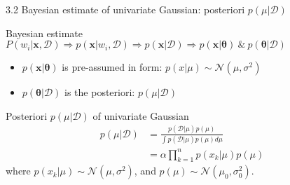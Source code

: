 \documentclass[compress,blue]{beamer}
\newcommand{\bx}{\mathbf{x}}
\newcommand{\calD}{\mathcal{D}}
\begin{document}
\begin{frame}{3.2 Bayesian estimate of univariate Gaussian: posteriori $p(\mu|\calD)$}
	\begin{block}{Bayesian estimate}
		$P(w_i | \bx, \calD) \Rightarrow p(\bx | w_i, \calD) \Rightarrow p(\bx | \calD) \Rightarrow p(\bx | \mathbf{\theta}) ~\&~ p(\mathbf{\theta} | \calD) $
		\begin{itemize}
			\item  $p(\bx | \mathbf{\theta})$ is pre-assumed in form: $p(x|\mu) \sim \mathcal{N}(\mu, \sigma^2)$
			\item $p(\mathbf{\theta} | \calD)$ is the posteriori: $p(\mu|\calD)$
		\end{itemize}
	\end{block}

	\begin{block}{Posteriori $p(\mu|\calD)$ of univariate Gaussian}
		\vspace{-0.15in}
		\begin{align}
			p(\mu|\calD) &= \frac{p(\calD | \mu) p(\mu)}{\int p(\calD | \mu) p(\mu) d\mu} \\
			& = \alpha \prod_{k=1}^n p(x_k | \mu)p(\mu)
		\end{align}
		where $p(x_k | \mu) \sim \mathcal{N}(\mu, \sigma^2)$, and $p(\mu) \sim \mathcal{N}(\mu_0, \sigma_0^2)$.
	\end{block}
\end{frame}
\end{document}
